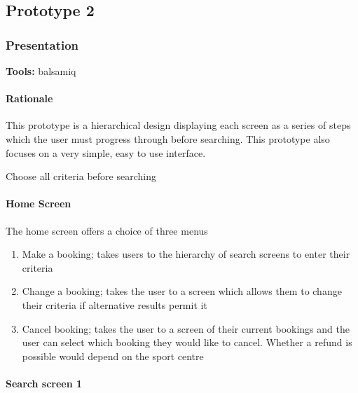 \newpage
\subsection{Prototype 2}

\subsubsection{Presentation}
\textbf{Tools:} balsamiq

\paragraph{Rationale}
This prototype is a hierarchical design displaying each screen as a series of
steps which the user must progress through before searching. This prototype
also focuses on a very simple, easy to use interface.

Choose all criteria before searching

\paragraph{Home Screen}

The home screen offers a choice of three menus

\begin{enumerate}
	\item Make a booking; takes users to the hierarchy of search screens to
		enter their criteria
	\item Change a booking; takes the user to a screen which allows them to
		change their criteria if alternative results permit it
	\item Cancel booking; takes the user to a screen of their current bookings
		and the user can select which booking they would like to cancel.
		Whether a refund is possible would depend on the sport centre
\end{enumerate}

\paragraph{Search screen 1}

